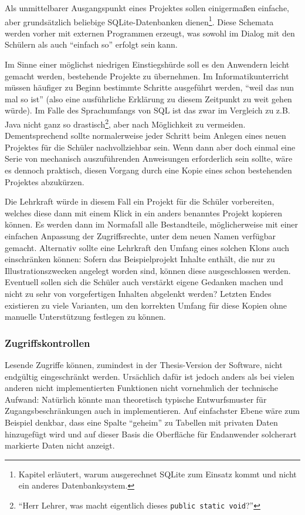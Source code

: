 Als unmittelbarer Ausgangspunkt eines Projektes sollen einigermaßen einfache, aber grundsätzlich beliebige SQLite-Datenbanken dienen\footnote{Kapitel  erläutert, warum ausgerechnet SQLite zum Einsatz kommt und nicht ein anderes Datenbanksystem.}. Diese Schemata werden vorher mit externen Programmen erzeugt, was sowohl im Dialog mit den Schülern als auch "`einfach so"' erfolgt sein kann.

Im Sinne einer möglichst niedrigen Einstiegshürde soll es den Anwendern leicht gemacht werden, bestehende Projekte zu übernehmen. Im Informatikunterricht müssen häufiger zu Beginn bestimmte Schritte ausgeführt werden, "`weil das nun mal so ist"' (also eine ausführliche Erklärung zu diesem Zeitpunkt zu weit gehen würde). Im Falle des Sprach\-umfangs von SQL ist das zwar im Vergleich zu z.B. Java nicht ganz so drastisch\footnote{"`Herr Lehrer, was macht eigentlich dieses \texttt{public static void}?"'}, aber nach Möglichkeit zu vermeiden. Dementsprechend sollte normalerweise jeder Schritt beim Anlegen eines neuen Projektes für die Schüler nachvollziehbar sein. Wenn dann aber doch einmal eine Serie von mechanisch auszuführenden Anweisungen erforderlich sein sollte, wäre es dennoch praktisch, diesen Vorgang durch eine Kopie eines schon bestehenden Projektes abzukürzen.

Die Lehrkraft würde in diesem Fall ein Projekt für die Schüler vorbereiten, welches diese dann mit einem Klick in ein anders benanntes Projekt kopieren können. Es werden dann im Normafall alle Bestandteile, möglicherweise mit einer einfachen Anpassung der Zugriffsrechte, unter dem neuen Namen verfügbar gemacht. Alternativ sollte eine Lehrkraft den Umfang eines solchen Klons auch einschränken können: Sofern das Beispielprojekt Inhalte enthält, die nur zu Illustrationszwecken angelegt worden sind, können diese ausgeschlossen werden. Eventuell sollen sich die Schüler auch verstärkt eigene Gedanken machen und nicht zu sehr von vorgefertigen Inhalten abgelenkt werden? Letzten Endes existieren zu viele Varianten, um den korrekten Umfang für diese Kopien ohne manuelle Unterstützung festlegen zu können.

\subsubsection{Zugriffskontrollen}
\label{sec:concept-access-control}

Lesende Zugriffe können, zumindest in der Thesis-Version der Software, nicht endgültig eingeschränkt werden. Ursächlich dafür ist jedoch anders als bei vielen anderen nicht implementierten Funktionen nicht vornehmlich der technische Aufwand: Natürlich könnte man theoretisch typische Entwurfsmuster für Zugangsbeschränkungen auch in \idename{} implementieren. Auf einfachster Ebene wäre zum Beispiel denkbar, dass eine Spalte "`geheim"' zu Tabellen mit privaten Daten hinzugefügt wird und auf dieser Basis die Oberfläche für Endanwender solcherart markierte Daten nicht anzeigt.

